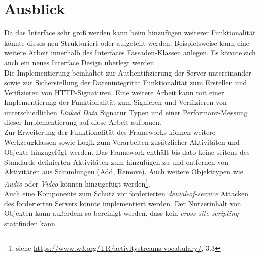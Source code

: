 \chapter{Ausblick}
\label{ch:Conclusion}
Da das Interface sehr groß werden kann beim hinzufügen weiterer Funktionalität könnte dieses neu Strukturiert oder aufgeteilt werden. Beispielsweise kann eine weitere Arbeit innerhalb des Interfaces Fassaden-Klassen anlegen. Es könnte sich auch ein neues Interface Design überlegt werden.\\

Die Implementierung beinhaltet zur Authentifizierung der Server untereinander sowie zur Sicherstellung der Datenintegrität Funktionalität zum Erstellen und Verifizieren von HTTP-Signaturen. Eine weitere Arbeit kann mit einer Implementierung der Funktionalität zum Signieren und Verifizieren von unterschiedlichen \textit{Linked Data} Signatur Typen und einer Performanz-Messung dieser Implementierung auf diese Arbeit aufbauen.\\

Zur Erweiterung der Funktionalität des Frameworks können weitere Werkzeugklassen sowie Logik zum Verarbeiten zusätzlicher Aktivitäten und Objekte hinzugefügt werden. Das Framework enthält bis dato keine seitens des Standards definierten Aktivitäten zum hinzufügen zu und entfernen von Aktivitäten aus Sammlungen (Add, Remove). Auch weitere Objekttypen wie \textit{Audio} oder \textit{Video} können hinzugefügt werden\footnote{siehe \url{https://www.w3.org/TR/activitystreams-vocabulary/}, 3.3}.\\

Auch eine Komponente zum Schutz vor förderierten \textit{denial-of-service} Attacken des förderierten Servers könnte implementiert werden. Der Nutzerinhalt von Objekten kann außerdem so bereinigt werden, dass kein \textit{cross-site-scripting} stattfinden kann.\\

